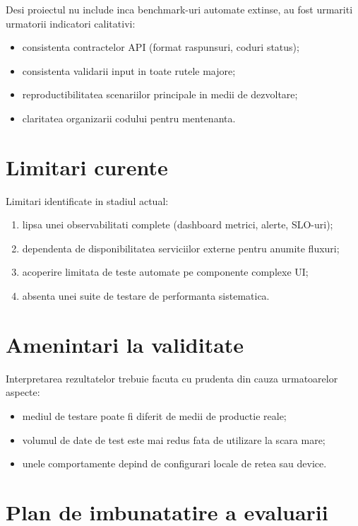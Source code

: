 Desi proiectul nu include inca benchmark-uri automate extinse, au fost urmariti urmatorii indicatori calitativi:
\begin{itemize}[leftmargin=1.2cm]
    \item consistenta contractelor API (format raspunsuri, coduri status);
    \item consistenta validarii input in toate rutele majore;
    \item reproductibilitatea scenariilor principale in medii de dezvoltare;
    \item claritatea organizarii codului pentru mentenanta.
\end{itemize}

\section{Limitari curente}

Limitari identificate in stadiul actual:
\begin{enumerate}[leftmargin=1.2cm]
    \item lipsa unei observabilitati complete (dashboard metrici, alerte, SLO-uri);
    \item dependenta de disponibilitatea serviciilor externe pentru anumite fluxuri;
    \item acoperire limitata de teste automate pe componente complexe UI;
    \item absenta unei suite de testare de performanta sistematica.
\end{enumerate}

\section{Amenintari la validitate}

Interpretarea rezultatelor trebuie facuta cu prudenta din cauza urmatoarelor aspecte:
\begin{itemize}[leftmargin=1.2cm]
    \item mediul de testare poate fi diferit de medii de productie reale;
    \item volumul de date de test este mai redus fata de utilizare la scara mare;
    \item unele comportamente depind de configurari locale de retea sau device.
\end{itemize}

\section{Plan de imbunatatire a evaluarii}

